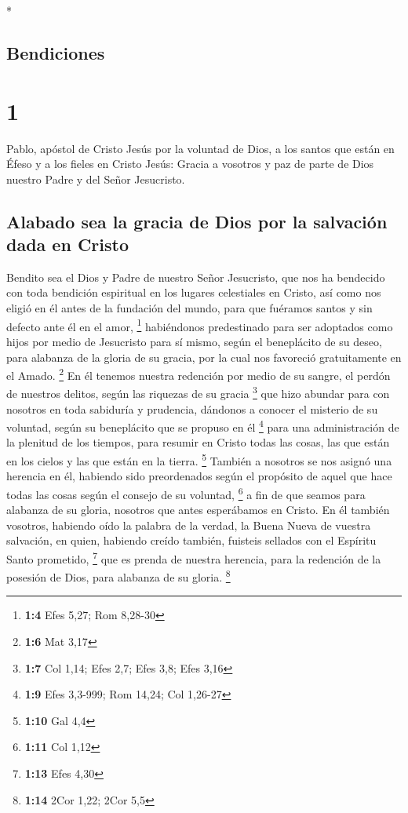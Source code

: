\begin{paracol}{2} \switchcolumn[0]*

\hypertarget{bendiciones}{%
\subsection{Bendiciones}\label{bendiciones}}

\hypertarget{section}{%
\section{1}\label{section}}

 Pablo, apóstol de Cristo Jesús por la voluntad de Dios, a
los santos que están en Éfeso y a los fieles en Cristo Jesús:
 Gracia a vosotros y paz de parte de Dios nuestro Padre y
del Señor Jesucristo.

\hypertarget{alabado-sea-la-gracia-de-dios-por-la-salvaciuxf3n-dada-en-cristo}{%
\subsection{Alabado sea la gracia de Dios por la salvación dada en
Cristo}\label{alabado-sea-la-gracia-de-dios-por-la-salvaciuxf3n-dada-en-cristo}}

 Bendito sea el Dios y Padre de nuestro Señor Jesucristo,
que nos ha bendecido con toda bendición espiritual en los lugares
celestiales en Cristo,  así como nos eligió en él antes de
la fundación del mundo, para que fuéramos santos y sin defecto ante él
en el amor, \footnote{\textbf{1:4} Efes 5,27; Rom 8,28-30}
 habiéndonos predestinado para ser adoptados como hijos
por medio de Jesucristo para sí mismo, según el beneplácito de su deseo,
 para alabanza de la gloria de su gracia, por la cual nos
favoreció gratuitamente en el Amado. \footnote{\textbf{1:6} Mat 3,17}
 En él tenemos nuestra redención por medio de su sangre,
el perdón de nuestros delitos, según las riquezas de su gracia
\footnote{\textbf{1:7} Col 1,14; Efes 2,7; Efes 3,8; Efes 3,16}
 que hizo abundar para con nosotros en toda sabiduría y
prudencia,  dándonos a conocer el misterio de su voluntad,
según su beneplácito que se propuso en él \footnote{\textbf{1:9} Efes
  3,3-999; Rom 14,24; Col 1,26-27}  para una
administración de la plenitud de los tiempos, para resumir en Cristo
todas las cosas, las que están en los cielos y las que están en la
tierra. \footnote{\textbf{1:10} Gal 4,4}  También a
nosotros se nos asignó una herencia en él, habiendo sido preordenados
según el propósito de aquel que hace todas las cosas según el consejo de
su voluntad, \footnote{\textbf{1:11} Col 1,12}  a fin de
que seamos para alabanza de su gloria, nosotros que antes esperábamos en
Cristo.  En él también vosotros, habiendo oído la palabra
de la verdad, la Buena Nueva de vuestra salvación, en quien, habiendo
creído también, fuisteis sellados con el Espíritu Santo prometido,
\footnote{\textbf{1:13} Efes 4,30}  que es prenda de
nuestra herencia, para la redención de la posesión de Dios, para
alabanza de su gloria. \footnote{\textbf{1:14} 2Cor 1,22; 2Cor 5,5}


\end{paracol}
